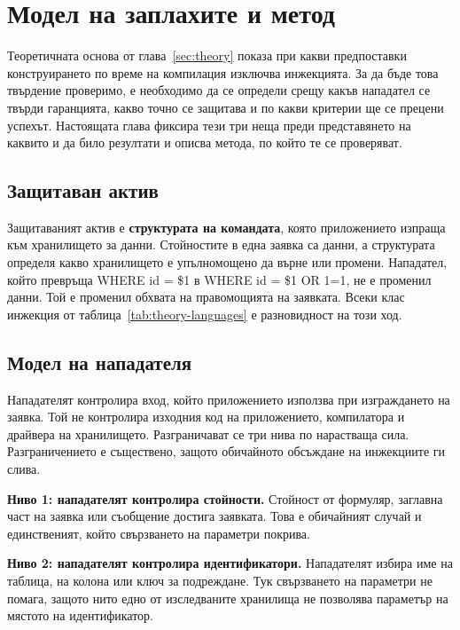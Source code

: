 \section{Модел на заплахите и метод}
\label{sec:threat-model}

Теоретичната основа от глава~\ref{sec:theory} показа при какви предпоставки
конструирането по време на компилация изключва инжекцията. За да бъде това
твърдение проверимо, е необходимо да се определи срещу какъв нападател се
твърди гаранцията, какво точно се защитава и по какви критерии ще се прецени
успехът. Настоящата глава фиксира тези три неща преди представянето на каквито и
да било резултати и описва метода, по който те се проверяват.

\subsection{Защитаван актив}
\label{sec:tm-asset}

Защитаваният актив е \textbf{структурата на командата}, която приложението
изпраща към хранилището за данни. Стойностите в една заявка са данни, а
структурата определя какво хранилището е упълномощено да върне или промени.
Нападател, който превръща {\ttfamily WHERE id = \$1} в
{\ttfamily WHERE id = \$1 OR 1=1}, не е променил данни. Той е променил обхвата на
правомощията на заявката. Всеки клас инжекция от
таблица~\ref{tab:theory-languages} е разновидност на този ход.

\subsection{Модел на нападателя}
\label{sec:tm-attacker}

Нападателят контролира вход, който приложението използва при изграждането на
заявка. Той не контролира изходния код на приложението, компилатора и
драйвера на хранилището. Разграничават се три нива по нарастваща сила.
Разграничението е съществено, защото обичайното обсъждане на инжекциите ги
слива.

\textbf{Ниво 1: нападателят контролира стойности.} Стойност от формуляр, заглавна
част на заявка или съобщение достига заявката. Това е обичайният случай и
единственият, който свързването на параметри покрива.

\textbf{Ниво 2: нападателят контролира идентификатори.} Нападателят избира име на
таблица, на колона или ключ за подреждане. Тук свързването на параметри не
помага, защото нито едно от изследваните хранилища не позволява параметър на
мястото на идентификатор.

